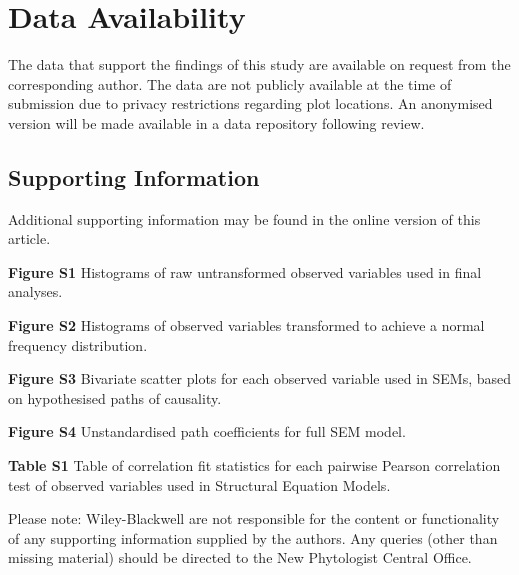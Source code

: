 \documentclass[12pt,a4paper]{article}
\begin{document}
\section{Data Availability}

The data that support the findings of this study are available on request from the corresponding author. The data are not publicly available at the time of submission due to privacy restrictions regarding plot locations. An anonymised version will be made available in a data repository following review.



\vspace{0.5cm}

\begin{minipage}{\linewidth}
\begin{framed}
\section*{Supporting Information}

Additional supporting information may be found in the online version of this article.
\vspace{0.2cm}

\textbf{Figure S1} Histograms of raw untransformed observed variables used in final analyses.
\vspace{0.2cm}

\textbf{Figure S2} Histograms of observed variables transformed to achieve a normal frequency distribution.
\vspace{0.2cm}

\textbf{Figure S3} Bivariate scatter plots for each observed variable used in SEMs, based on hypothesised paths of causality.
\vspace{0.2cm}

\textbf{Figure S4} Unstandardised path coefficients for full SEM model.
\vspace{0.2cm}

\textbf{Table S1} Table of correlation fit statistics for each pairwise Pearson correlation test of observed variables used in Structural Equation Models.
\vspace{0.2cm}

Please note: Wiley-Blackwell are not responsible for the content or functionality of any supporting information supplied by the authors. Any queries (other than missing material) should be directed to the New Phytologist Central Office.
\end{framed}
\end{minipage}
\end{document}
